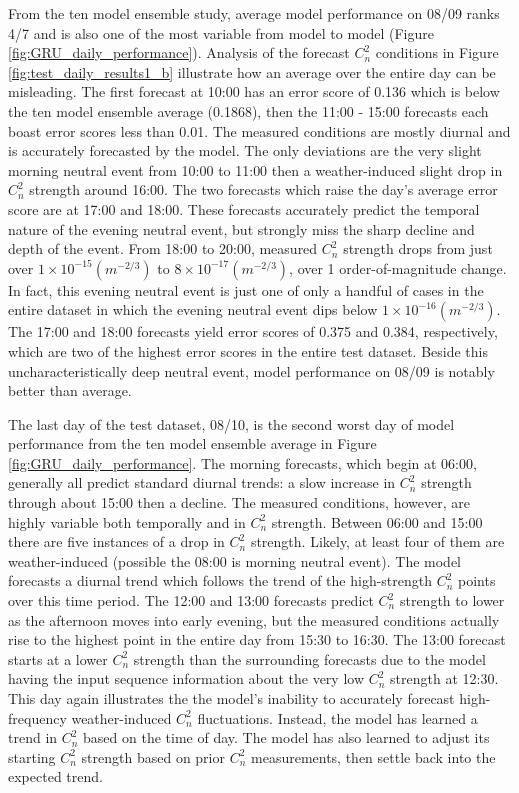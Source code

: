 From the ten model ensemble study, average model performance on 08/09 ranks 4/7 and is also one of the most variable from model to model (Figure \ref{fig:GRU_daily_performance}). Analysis of the forecast $C_{n}^{2}$ conditions in Figure \ref{fig:test_daily_results1_b} illustrate how an average over the entire day can be misleading. The first forecast at 10:00 has an error score of 0.136 which is below the ten model ensemble average (0.1868), then the 11:00 - 15:00 forecasts each boast error scores less than 0.01. The measured conditions are mostly diurnal and is accurately forecasted by the model. The only deviations are the very slight morning neutral event from 10:00 to 11:00 then a weather-induced slight drop in $C_{n}^{2}$ strength around 16:00. The two forecasts which raise the day's average error score are at 17:00 and 18:00. These forecasts accurately predict the temporal nature of the evening neutral event, but strongly miss the sharp decline and depth of the event. From 18:00 to 20:00, measured $C_{n}^{2}$ strength drops from just over $1 \times 10^{-15} (m^{-2/3})$ to $8 \times 10^{-17} (m^{-2/3})$, over 1 order-of-magnitude change. In fact, this evening neutral event is just one of only a handful of cases in the entire dataset in which the evening neutral event dips below $1 \times 10^{-16} (m^{-2/3})$. The 17:00 and 18:00 forecasts yield error scores of 0.375 and 0.384, respectively, which are two of the highest error scores in the entire test dataset. Beside this uncharacteristically deep neutral event, model performance on 08/09 is notably better than average.

The last day of the test dataset, 08/10, is the second worst day of model performance from the ten model ensemble average in Figure \ref{fig:GRU_daily_performance}. The morning forecasts, which begin at 06:00, generally all predict standard diurnal trends: a slow increase in $C_{n}^{2}$ strength through about 15:00 then a decline. The measured conditions, however, are highly variable both temporally and in $C_{n}^{2}$ strength. Between 06:00 and 15:00 there are five instances of a drop in $C_{n}^{2}$ strength. Likely, at least four of them are weather-induced (possible the 08:00 is morning neutral event). The model forecasts a diurnal trend which follows the trend of the high-strength $C_{n}^{2}$ points over this time period. The 12:00 and 13:00 forecasts predict $C_{n}^{2}$ strength to lower as the afternoon moves into early evening, but the measured conditions actually rise to the highest point in the entire day from 15:30 to 16:30. The 13:00 forecast starts at a lower $C_{n}^{2}$ strength than the surrounding forecasts due to the model having the input sequence information about the very low $C_{n}^{2}$ strength at 12:30. This day again illustrates the the model's inability to accurately forecast high-frequency weather-induced $C_{n}^{2}$ fluctuations. Instead, the model has learned a trend in $C_{n}^{2}$ based on the time of day. The model has also learned to adjust its starting $C_{n}^{2}$ strength based on prior $C_{n}^{2}$ measurements, then settle back into the expected trend. 

